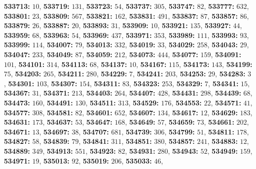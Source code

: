 \textsf{\bfseries 533713:} $10$, \textsf{\bfseries 533719:} $131$, \textsf{\bfseries 533723:} $54$, \textsf{\bfseries 533737:} $305$, \textsf{\bfseries 533747:} $82$, \textsf{\bfseries 533777:} $632$, \textsf{\bfseries 533801:} $23$, \textsf{\bfseries 533809:} $567$, \textsf{\bfseries 533821:} $162$, \textsf{\bfseries 533831:} $491$, \textsf{\bfseries 533837:} $87$, \textsf{\bfseries 533857:} $86$, \textsf{\bfseries 533879:} $26$, \textsf{\bfseries 533887:} $20$, \textsf{\bfseries 533893:} $31$, \textsf{\bfseries 533909:} $10$, \textsf{\bfseries 533921:} $135$, \textsf{\bfseries 533927:} $44$, \textsf{\bfseries 533959:} $68$, \textsf{\bfseries 533963:} $54$, \textsf{\bfseries 533969:} $437$, \textsf{\bfseries 533971:} $353$, \textsf{\bfseries 533989:} $111$, \textsf{\bfseries 533993:} $93$, \textsf{\bfseries 533999:} $114$, \textsf{\bfseries 534007:} $79$, \textsf{\bfseries 534013:} $332$, \textsf{\bfseries 534019:} $33$, \textsf{\bfseries 534029:} $258$, \textsf{\bfseries 534043:} $29$, \textsf{\bfseries 534047:} $233$, \textsf{\bfseries 534049:} $87$, \textsf{\bfseries 534059:} $212$, \textsf{\bfseries 534073:} $444$, \textsf{\bfseries 534077:} $159$, \textsf{\bfseries 534091:} $101$, \textsf{\bfseries 534101:} $314$, \textsf{\bfseries 534113:} $68$, \textsf{\bfseries 534137:} $10$, \textsf{\bfseries 534167:} $115$, \textsf{\bfseries 534173:} $143$, \textsf{\bfseries 534199:} $75$, \textsf{\bfseries 534203:} $265$, \textsf{\bfseries 534211:} $280$, \textsf{\bfseries 534229:} $7$, \textsf{\bfseries 534241:} $203$, \textsf{\bfseries 534253:} $29$, \textsf{\bfseries 534283:} $3$, \textsf{\bfseries 534301:} $103$, \textsf{\bfseries 534307:} $154$, \textsf{\bfseries 534311:} $83$, \textsf{\bfseries 534323:} $253$, \textsf{\bfseries 534329:} $7$, \textsf{\bfseries 534341:} $15$, \textsf{\bfseries 534367:} $31$, \textsf{\bfseries 534371:} $213$, \textsf{\bfseries 534403:} $264$, \textsf{\bfseries 534407:} $428$, \textsf{\bfseries 534431:} $298$, \textsf{\bfseries 534439:} $68$, \textsf{\bfseries 534473:} $160$, \textsf{\bfseries 534491:} $130$, \textsf{\bfseries 534511:} $313$, \textsf{\bfseries 534529:} $176$, \textsf{\bfseries 534553:} $22$, \textsf{\bfseries 534571:} $41$, \textsf{\bfseries 534577:} $308$, \textsf{\bfseries 534581:} $82$, \textsf{\bfseries 534601:} $652$, \textsf{\bfseries 534607:} $134$, \textsf{\bfseries 534617:} $12$, \textsf{\bfseries 534629:} $183$, \textsf{\bfseries 534631:} $173$, \textsf{\bfseries 534637:} $53$, \textsf{\bfseries 534647:} $168$, \textsf{\bfseries 534649:} $57$, \textsf{\bfseries 534659:} $73$, \textsf{\bfseries 534661:} $202$, \textsf{\bfseries 534671:} $13$, \textsf{\bfseries 534697:} $38$, \textsf{\bfseries 534707:} $681$, \textsf{\bfseries 534739:} $306$, \textsf{\bfseries 534799:} $51$, \textsf{\bfseries 534811:} $178$, \textsf{\bfseries 534827:} $58$, \textsf{\bfseries 534839:} $79$, \textsf{\bfseries 534841:} $311$, \textsf{\bfseries 534851:} $380$, \textsf{\bfseries 534857:} $241$, \textsf{\bfseries 534883:} $12$, \textsf{\bfseries 534889:} $349$, \textsf{\bfseries 534913:} $551$, \textsf{\bfseries 534923:} $82$, \textsf{\bfseries 534931:} $280$, \textsf{\bfseries 534943:} $52$, \textsf{\bfseries 534949:} $159$, \textsf{\bfseries 534971:} $19$, \textsf{\bfseries 535013:} $92$, \textsf{\bfseries 535019:} $206$, \textsf{\bfseries 535033:} $46$, 
